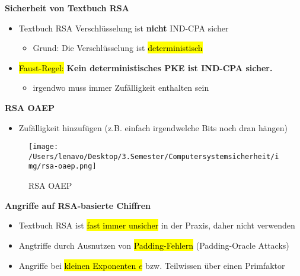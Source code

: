 \documentclass[a4paper, 10pt]{article}
\begin{document}
\noindent\textbf{Sicherheit von Textbuch RSA}
\begin{itemize}
    \item Textbuch RSA Verschlüsselung ist \textbf{nicht} IND-CPA sicher
    \begin{itemize}
        \item Grund: Die Verschlüsselung ist \hl{deterministisch}
    \end{itemize}

    \item \hl{Faust-Regel:} \textbf{Kein deterministisches PKE ist IND-CPA sicher.}
    \begin{itemize}
        \item irgendwo muss immer Zufälligkeit enthalten sein
    \end{itemize}
\end{itemize}
\textbf{RSA OAEP}
\begin{itemize}
    \item Zufälligkeit hinzufügen (z.B. einfach irgendwelche Bits noch dran hängen)
\end{itemize}
\begin{figure}[h]
    \centering
    \texttt{[image: /Users/lenavo/Desktop/3.Semester/Computersystemsicherheit/img/rsa-oaep.png]}
    \caption{RSA OAEP}
    \label{fig:enter-label}
\end{figure}
\textbf{Angriffe auf RSA-basierte Chiffren}
\begin{itemize}
    \item Textbuch RSA ist \hl{fast immer unsicher} in der Praxis, daher nicht verwenden
    \item Angtriffe durch Ausnutzen von \hl{Padding-Fehlern} (Padding-Oracle Attacks)
    \item Angriffe bei \hl{kleinen Exponenten $e$} bzw. Teilwissen über einen Primfaktor
\end{itemize}
\end{document}
